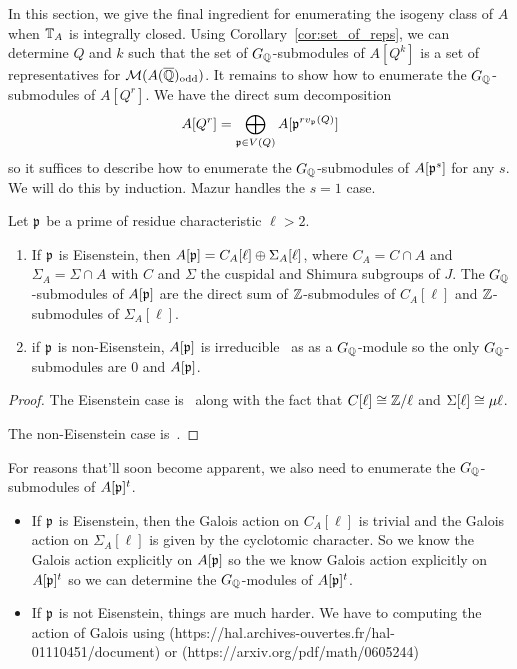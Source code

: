 \documentclass{article}
\newcommand{\odd}{\mathrm{odd}}
\begin{document}
In this section, we give the final ingredient for enumerating the isogeny class of $A$
when $\mathbb{T}_A$ is integrally closed. Using Corollary~\ref{cor:set_of_reps}, we
can determine $Q$ and $k$ such that the set of $G_{\mathbb{Q}}$-submodules of $A[Q^k]$
is a set of representatives for $\M(A(\QQbar)_\odd)$. It remains to show how to
enumerate the $G_{\mathbb{Q}}$-submodules of $A[Q^r]$. We have the direct sum
decomposition
\[
    A[Q^r]=\bigoplus_{\mathfrak{p}\in V(Q)} A[\mathfrak{p}^{rv_{\mathfrak{p}}(Q)}]
\]
so it suffices to describe how to enumerate the $G_{\mathbb{Q}}$-submodules of $A[\mathfrak{p}^s]$ for
any $s$. We will do this by induction. Mazur handles the $s=1$ case.


\begin{proposition}[Mazur]\label{prop:all_G_subs}
    Let $\mathfrak{p}$ be a prime of residue characteristic $\ell>2$.
    \begin{enumerate}
        \item 
            If $\mathfrak{p}$ is Eisenstein, then $A[\mathfrak{p}]=C_A[\ell]\oplus \Sigma_A[\ell]$,
            where $C_A=C\cap A$ and $\Sigma_A=\Sigma \cap A$ with $C$ and
            $\Sigma$ the cuspidal and Shimura subgroups of $J$. The
            $G_{\mathbb{Q}}$-submodules of $A[\mathfrak{p}]$ are the direct sum of $\mathbb{Z}$-submodules of
            $C_A[\ell]$ and $\mathbb{Z}$-submodules of $\Sigma_A[\ell]$.
        \item
            if $\mathfrak{p}$ is non-Eisenstein, $A[\mathfrak{p}]$ is irreducible~\cite[Prop
            14.2]{mazur:eisenstein} as as a $G_{\mathbb{Q}}$-module so the only
            $G_{\mathbb{Q}}$-submodules are $0$ and $A[\mathfrak{p}]$.
    \end{enumerate}
\end{proposition}
\begin{proof}
    The Eisenstein case is~\cite[Corollary 16.3]{mazur:eisenstein} along with
    the fact that $C[\ell]\cong \mathbb{Z}/\ell$ and $\Sigma[\ell]\cong \mu\ell$.

    The non-Eisenstein case is~\cite[Propositon 14.2]{mazur:eisenstein}.
\end{proof}

For reasons that'll soon become apparent, we also need to enumerate the
$G_{\mathbb{Q}}$-submodules of $A[\mathfrak{p}]^t$.
\begin{itemize}
    \item 
        If $\mathfrak{p}$ is Eisenstein, then the Galois action on $C_A[\ell]$ is trivial
        and the Galois action on $\Sigma_A[\ell]$ is given by the cyclotomic
        character. So we know the Galois action explicitly on $A[\mathfrak{p}]$ so the we
        know Galois action explicitly on $A[\mathfrak{p}]^t$ so we can determine the
        $G_{\mathbb{Q}}$-modules of $A[\mathfrak{p}]^t$.
    \item
        If $\mathfrak{p}$ is not Eisenstein, things are much harder. We have to computing
        the action of Galois using
        (https://hal.archives-ouvertes.fr/hal-01110451/document) or
        (https://arxiv.org/pdf/math/0605244)
\end{itemize}
\end{document}
